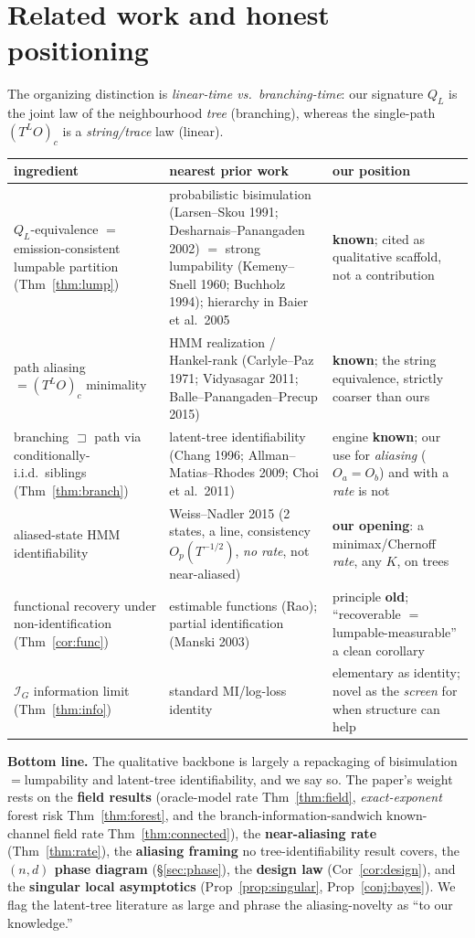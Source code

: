 \documentclass[11pt]{article}
\begin{document}
\section{Related work and honest positioning}\label{sec:related}
The organizing distinction is \emph{linear-time vs.\ branching-time}: our signature $Q_L$ is the joint law of the
neighbourhood \emph{tree} (branching), whereas the single-path $(T^{L}O)_c$ is a \emph{string/trace} law (linear).
\begin{center}\small
\begin{tabular}{p{4.6cm}p{4.9cm}p{4.4cm}}
\toprule
ingredient & nearest prior work & our position \\ \midrule
$Q_L$-equivalence $=$ emission-consistent lumpable partition (Thm~\ref{thm:lump}) &
probabilistic bisimulation (Larsen--Skou 1991; Desharnais--Panangaden 2002) $=$ strong lumpability (Kemeny--Snell
1960; Buchholz 1994); hierarchy in Baier et al.\ 2005 & \textbf{known}; cited as qualitative scaffold, not a
contribution \\
path aliasing $=(T^{L}O)_c$ minimality & HMM realization / Hankel-rank (Carlyle--Paz 1971; Vidyasagar 2011;
Balle--Panangaden--Precup 2015) & \textbf{known}; the string equivalence, strictly coarser than ours \\
branching $\sqsupset$ path via conditionally-i.i.d.\ siblings (Thm~\ref{thm:branch}) & latent-tree identifiability
(Chang 1996; Allman--Matias--Rhodes 2009; Choi et al.\ 2011) & engine \textbf{known}; our use for
\emph{aliasing} ($O_a{=}O_b$) and with a \emph{rate} is not \\
aliased-state HMM identifiability & Weiss--Nadler 2015 (2 states, a line, consistency $O_p(T^{-1/2})$, \emph{no
rate}, not near-aliased) & \textbf{our opening}: a minimax/Chernoff \emph{rate}, any $K$, on trees \\
functional recovery under non-identification (Thm~\ref{cor:func}) & estimable functions (Rao); partial
identification (Manski 2003) & principle \textbf{old}; ``recoverable $=$ lumpable-measurable'' a clean corollary \\
$\mathcal I_G$ information limit (Thm~\ref{thm:info}) & standard MI/log-loss identity & elementary as identity;
novel as the \emph{screen} for when structure can help \\
\bottomrule
\end{tabular}
\end{center}
\noindent\textbf{Bottom line.} The qualitative backbone is largely a repackaging of bisimulation$=$lumpability and
latent-tree identifiability, and we say so. The paper's weight rests on the \textbf{field results}
(oracle-model rate Thm~\ref{thm:field}, \emph{exact-exponent} forest risk Thm~\ref{thm:forest}, and the
branch-information-sandwich known-channel field rate Thm~\ref{thm:connected}), the \textbf{near-aliasing rate}
(Thm~\ref{thm:rate}), the \textbf{aliasing framing} no tree-identifiability result covers, the \textbf{$(n,d)$
phase diagram} (\S\ref{sec:phase}), the \textbf{design law} (Cor~\ref{cor:design}), and the \textbf{singular
local asymptotics} (Prop~\ref{prop:singular}, Prop~\ref{conj:bayes}). We flag the latent-tree literature as large and phrase the
aliasing-novelty as ``to our knowledge.''
\end{document}
